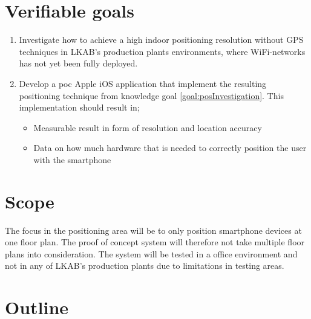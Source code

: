 \section{Verifiable goals}\label{sec:goals}
\begin{enumerate}
\item \label{goal:posInvestigation}
Investigate how to achieve a high indoor positioning resolution without GPS
techniques in LKAB's production plants environments, where WiFi-networks has
not yet been fully deployed.

\item \label{goal:poc}
Develop a \acrfull{poc} Apple iOS application that implement the resulting
positioning technique from knowledge goal \ref{goal:posInvestigation}. This
implementation should result in;
\begin{itemize}
\item Measurable result in form of resolution and location accuracy
\item Data on how much hardware that is needed to correctly position the user with the smartphone
\end{itemize}
\end{enumerate}


\section{Scope}
The focus in the positioning area will be to only position smartphone devices at one floor plan.
The proof of concept system will therefore not take multiple floor plans into consideration.
The system will be tested in a office environment and not in any of LKAB's production plants due to
limitations in testing areas.


\section{Outline}
